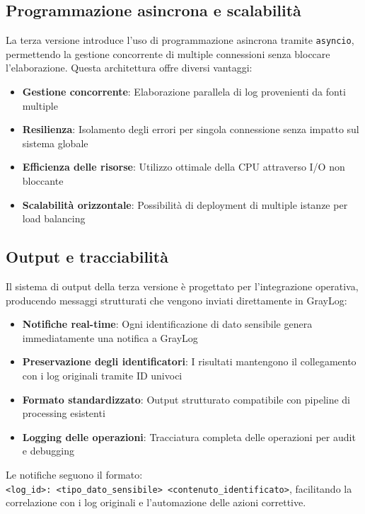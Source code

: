 \documentclass[12pt]{report}
\begin{document}
\subsection{Programmazione asincrona e scalabilità}
\label{subsec:ver3_asincrona}

La terza versione introduce l'uso di programmazione asincrona tramite \texttt{asyncio}, permettendo la gestione concorrente di multiple connessioni senza bloccare l'elaborazione. Questa architettura offre diversi vantaggi:

\begin{itemize}
    \item \textbf{Gestione concorrente}: Elaborazione parallela di log provenienti da fonti multiple
    \item \textbf{Resilienza}: Isolamento degli errori per singola connessione senza impatto sul sistema globale
    \item \textbf{Efficienza delle risorse}: Utilizzo ottimale della CPU attraverso I/O non bloccante
    \item \textbf{Scalabilità orizzontale}: Possibilità di deployment di multiple istanze per load balancing
\end{itemize}

\subsection{Output e tracciabilità}
\label{subsec:ver3_output}

Il sistema di output della terza versione è progettato per l'integrazione operativa, producendo messaggi strutturati che vengono inviati direttamente in GrayLog:

\begin{itemize}
    \item \textbf{Notifiche real-time}: Ogni identificazione di dato sensibile genera immediatamente una notifica a GrayLog
    \item \textbf{Preservazione degli identificatori}: I risultati mantengono il collegamento con i log originali tramite ID univoci
    \item \textbf{Formato standardizzato}: Output strutturato compatibile con pipeline di processing esistenti
    \item \textbf{Logging delle operazioni}: Tracciatura completa delle operazioni per audit e debugging
\end{itemize}

Le notifiche seguono il formato: \\
\texttt{<log\_id>: <tipo\_dato\_sensibile> <contenuto\_identificato>}, facilitando la correlazione con i log originali e l'automazione delle azioni correttive.
\end{document}
